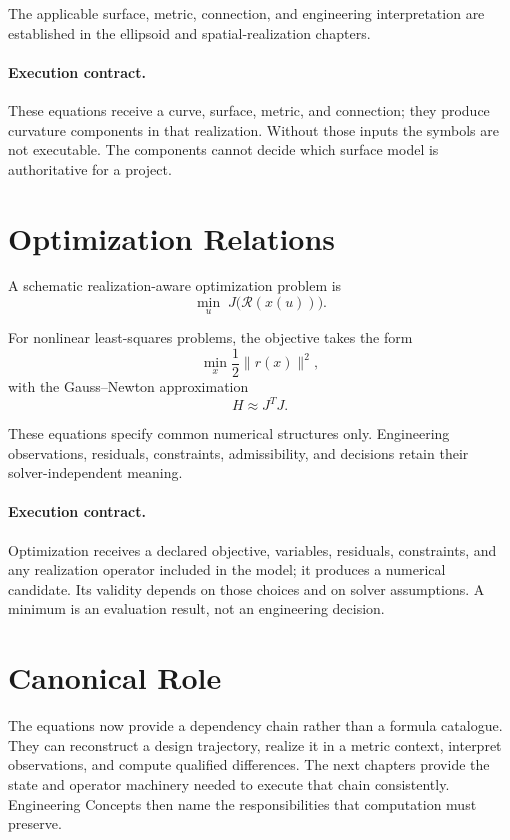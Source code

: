 The applicable surface, metric, connection, and engineering
interpretation are established in the ellipsoid and spatial-realization
chapters.

\paragraph{Execution contract.}
These equations receive a curve, surface, metric, and connection; they
produce curvature components in that realization. Without those inputs
the symbols are not executable. The components cannot decide which
surface model is authoritative for a project.

\section{Optimization Relations}

A schematic realization-aware optimization problem is
\begin{equation}
\min_u\;J\bigl(\mathcal R(x(u))\bigr).
\label{eq:general-optimization}
\end{equation}

For nonlinear least-squares problems, the objective takes the form
\begin{equation}
\min_x\frac12\|r(x)\|^2,
\label{eq:least-squares}
\end{equation}
with the Gauss--Newton approximation
\begin{equation}
H\approx J^T J.
\label{eq:gauss-newton}
\end{equation}

These equations specify common numerical structures only. Engineering
observations, residuals, constraints, admissibility, and decisions retain
their solver-independent meaning.

\paragraph{Execution contract.}
Optimization receives a declared objective, variables, residuals,
constraints, and any realization operator included in the model; it
produces a numerical candidate. Its validity depends on those choices
and on solver assumptions. A minimum is an evaluation result, not an
engineering decision.

\section{Canonical Role}

The equations now provide a dependency chain rather than a formula
catalogue. They can reconstruct a design trajectory, realize it in a
metric context, interpret observations, and compute qualified
differences. The next chapters provide the state and operator machinery
needed to execute that chain consistently. Engineering Concepts then
name the responsibilities that computation must preserve.
